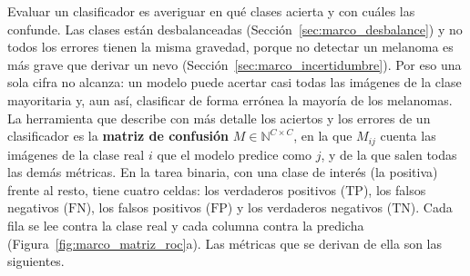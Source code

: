 Evaluar un clasificador es averiguar en qué clases acierta y con cuáles las confunde. Las clases están
desbalanceadas (Sección~\ref{sec:marco_desbalance}) y no todos los errores tienen la misma gravedad, porque no
detectar un melanoma es más grave que derivar un nevo (Sección~\ref{sec:marco_incertidumbre}). Por eso una sola
cifra no alcanza: un modelo puede acertar casi todas las imágenes de la clase mayoritaria y, aun así, clasificar
de forma errónea la mayoría de los melanomas. La herramienta que describe con más detalle los aciertos y los
errores de un clasificador es la \textbf{matriz de confusión}
$M \in \mathbb{N}^{C \times C}$, en la que $M_{ij}$ cuenta las imágenes de la clase real $i$ que el modelo predice
como $j$, y de la que salen todas las demás métricas. En la tarea binaria, con una clase de interés (la positiva)
frente al resto, tiene cuatro celdas: los verdaderos positivos ($\mathrm{TP}$), los falsos negativos
($\mathrm{FN}$), los falsos positivos ($\mathrm{FP}$) y los verdaderos negativos ($\mathrm{TN}$). Cada fila se lee
contra la clase real y cada columna contra la predicha (Figura~\ref{fig:marco_matriz_roc}a). Las métricas
que se derivan de ella son las siguientes.



